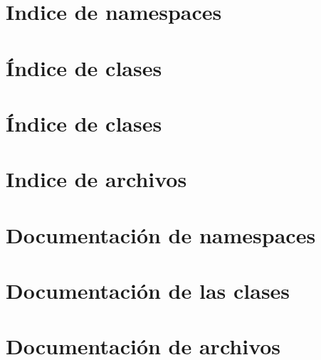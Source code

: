\documentclass[a4paper]{article}
\begin{document}
\section{\-Indice de namespaces}

\section{Índice de clases}

\section{Índice de clases}

\section{\-Indice de archivos}

\section{\-Documentación de namespaces}

\section{\-Documentación de las clases}






\section{\-Documentación de archivos}


\newpage 

\printindex
\end{document}
